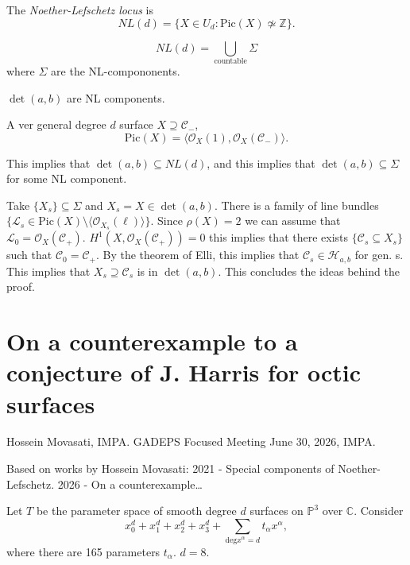 \begin{definition}
\label{definition-nl-locus}
The {\it Noether-Lefschetz locus} is
$$
NL(d)
=
\{ X \in U_d: \text{Pic}(X)\not\simeq
\mathbb{Z}\}.
$$
\end{definition}

\noindent
$$
NL(d) = \bigcup_{\operatorname{countable}}
\Sigma
$$
where $\Sigma$ are the NL-compononents.

\begin{theorem}[L,LH,V 24]
\label{theorem-llhv24ii}
$\det(a,b)$ are NL components.
\end{theorem}

\begin{theorem}[Lopez, 91]
\label{theorem-lopez-91}
A ver general degree $d$ surface
$X \supseteq \mathcal{C}_-$,
$$
\text{Pic}(X) = 
\langle \mathcal{O}_X(1),
\mathcal{O}_X(\mathcal{C}_-)\rangle.
$$
\end{theorem}

\noindent
This implies that $\det(a,b) \subseteq
NL(d)$,
and this implies that
$\det(a,b) \subseteq \Sigma$ for some
NL component.

Take $\{ X_s\} \subseteq \Sigma$
and $X_s = X \in \det(a,b)$.
There is a family of line bundles
$\{\mathcal{L}_s \in \text{Pic}(X)\setminus
\langle\mathcal{O}_{X_s}(\ell)\rangle\}$.
Since $\rho(X) = 2$ we can assume that
$\mathcal{L}_0 =
\mathcal{O}_X(\mathcal{C}_+)$.
$H^1(X,\mathcal{O}_X(\mathcal{C}_+))=0$
this implies that there exists
$\{\mathcal{C}_s \subseteq X_s\}$ such that
$\mathcal{C}_0 = \mathcal{C}_{+}$.
By the theorem of Elli, this implies that
$\mathcal{C}_s \in \mathcal{H}_{a,b}$ for
gen. s. This implies that
$X_s \supseteq \mathcal{C}_s$ is in 
$\det(a,b)$. This concludes the ideas
behind the proof.

\section{On a counterexample to a conjecture
of J. Harris for octic surfaces}
\label{section-counterexample-harris-conj}

\noindent
Hossein Movasati, IMPA.
GADEPS Focused Meeting June 30, 2026, IMPA.

\medskip\noindent
Based on works by Hossein Movasati:
2021 - Special components of
Noether-Lefschetz. 2026 - On a
counterexample…

\medskip\noindent
Let $T $ be the parameter space of smooth
degree $d$ surfaces on $\mathbb{P}^3$ over
$\mathbb{C}$.
Consider
$$
x_0^d+x_1^d+x_2^d+x_3^d
+\sum_{\text{deg}x^\alpha =d}t_\alpha
x^\alpha,
$$
where there are 165 parameters $t_\alpha$.
$d=8$.

